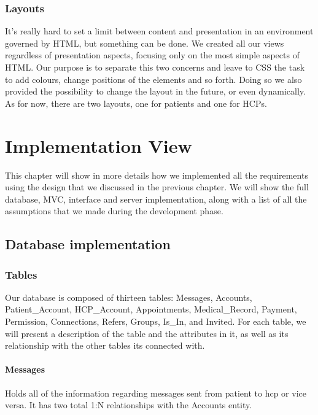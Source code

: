 \subsection{Layouts}
It's really hard to set a limit between content and presentation in an environment governed by HTML, but something can be done. We created all our views regardless of presentation aspects, focusing only on the most simple aspects of HTML. Our purpose is to separate this two concerns and leave to CSS the task to add colours, change positions of the elements and so forth. Doing so we also provided the possibility to change the layout in the future, or even dynamically. As for now, there are two layouts, one for patients and one for HCPs.



\chapter{Implementation View}
This chapter will show in more details how we implemented all the requirements using the design that we discussed in the previous chapter. We will show the full database, MVC, interface and server implementation, along with a list of all the assumptions that we made during the development phase.

\section{Database implementation}
\subsection{Tables}
Our database is composed of thirteen tables: Messages, Accounts, Patient\_Account, HCP\_Account, Appointments, Medical\_Record, Payment, Permission, Connections, Refers, Groups, Is\_In, and Invited.  For each table, we will present a description of the table and the attributes in it, as well as its relationship with the other tables its connected with.

\subsubsection{Messages}
Holds all of the information regarding messages sent from patient to hcp or vice versa. It has two total 1:N relationships with the Accounts entity.

